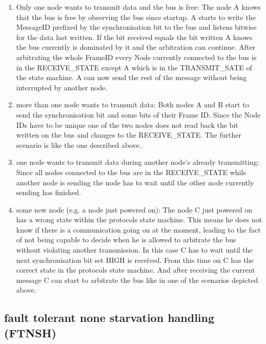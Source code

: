 \begin{enumerate}
 \item Only one node wants to transmit data and the bus is free: The node A knows that the bus is free by observing the bus since startup. A starts to write the MessageID prefixed by the synchronisation bit to the bus and listens bitwise for the data last written.
       If the bit received equals the bit written A knows the bus currently is dominated by it and the arbitration can continue. After arbitrating the whole FrameID every Node currently connected to the bus is in the RECEIVE\_STATE except A which is in the TRANSMIT\_SATE of the state machine.
       A can now send the rest of the message without being interrupted by another node.

 \item more than one node wants to transmit data: Both nodes A and B start to send the synchronisation bit and some bits of their Frame ID. Since the Node IDs have to be unique one of the two nodes does not read back the bit written on the bus and changes to the RECEIVE\_STATE. The further scenario is like the one described above.

 \item one node wants to transmit data during another node's already transmitting: Since all nodes connected to the bus are in the RECEIVE\_STATE while another node is sending the node has to wait until the other node currently sending has finished.

 \item some new node (e.g. a node just powered on): The node C just powered on has a wrong state within the protocols state machine. This means he does not know if there is a communication going on at the moment, leading to the fact of not being capable to decide when he is allowed to arbitrate the bus without violating another transmission.
       In this case C has to wait until the next synchronisation bit set HIGH is received. From this time on C has the correct state in the protocols state machine. And after receiving the current message C can start to arbitrate the bus like in one of the scenarios depicted above.
\end{enumerate}

\subsection{fault tolerant none starvation handling (FTNSH)}
\label{sec:bus:ftnsh}

